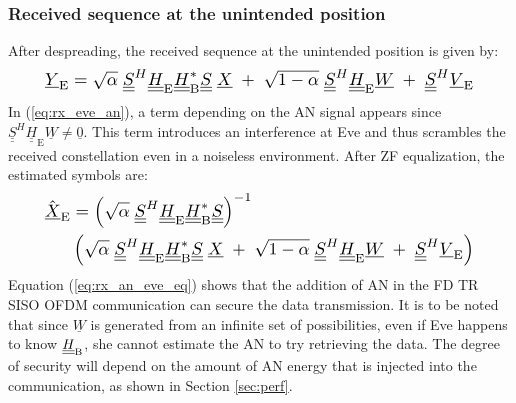 \documentclass[conference]{IEEEtran}
\begin{document}
\subsubsection{Received sequence at the unintended position}
After despreading, the received sequence at the unintended position is given by:
\begin{equation}
\resizebox{0.89\hsize}{!}{$
    \underline{Y}_{\text{E}} = \sqrt{\alpha} \; \underline{\underline{S}}^H \underline{\underline{H}}_{\text{E}} \underline{\underline{H}}^*_{\text{B}} \underline{\underline{S}}\; \underline{X} \; +  \; \sqrt{1-\alpha} \; \underline{\underline{S}}^H \underline{\underline{H}}_{\text{E}} \underline{W}  \; +  \; \underline{\underline{S}}^H  \underline{V}_\text{E} $}
    \label{eq:rx_eve_an}
\end{equation}
In (\ref{eq:rx_eve_an}), a term depending on the AN signal appears since $ \underline{\underline{S}}^H\underline{\underline{H}}_{\text{E}} \underline{W} \neq \underline{0}$. This term introduces an interference at Eve and thus scrambles the received constellation even in a noiseless environment. After ZF equalization, the estimated symbols are:
\begin{equation}
\resizebox{0.89\hsize}{!}{$
    \begin{split}
         \hat{\underline{X}}_{\text{E}} &= \left( \sqrt{\alpha} \; \underline{\underline{S}}^H \underline{\underline{H}}_{\text{E}} \underline{\underline{H}}^*_{\text{B}} \underline{\underline{S}} \right)^{-1} \\
         & \left( \sqrt{\alpha} \;\underline{\underline{S}}^H \underline{\underline{H}}_{\text{E}} \underline{\underline{H}}^*_{\text{B}} \underline{\underline{S}}\; \underline{X} \; +  \; \sqrt{1-\alpha} \; \underline{\underline{S}}^H \underline{\underline{H}}_{\text{E}} \underline{W}  \; +  \; \underline{\underline{S}}^H  \underline{V}_\text{E}  \right)
    \end{split}$}
    \label{eq:rx_an_eve_eq}
\end{equation}
Equation (\ref{eq:rx_an_eve_eq}) shows that the addition of AN in the FD TR SISO OFDM communication can secure the data transmission. It is to be noted that since $\underline{W}$ is generated from an infinite set of possibilities, even if Eve happens to know $\underline{\underline{H}}_{\text{B}}$, she cannot estimate the AN to try retrieving the data.  The degree of security will depend on the amount of AN energy that is injected into the communication, as shown in Section \ref{sec:perf}.
\end{document}
